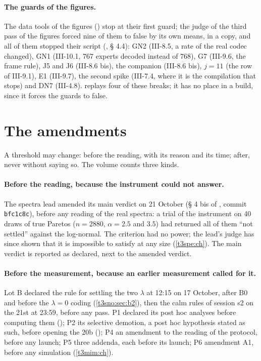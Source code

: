 \paragraph{The guards of the figures.} The data tools of the figures () stop at their first guard; the judge of the third pass of the figures forced nine of them to false by its own means, in a copy, and all of them stopped their script (, § 4.4): GN2 (III-8.5, a rate of the real codec changed), GN1 (III-10.1, 767 experts decoded instead of 768), G7 (III-9.6, the frame rule), J5 and J6 (III-8.6 bis), the companion (III-8.6 bis), $j = 11$ (the row of III-9.1), E1 (III-9.7), the second spike (III-7.4, where it is the compilation that stops) and DN7 (III-4.8).  replays four of these breaks; it has no place in a build, since it forces the guards to false.

\section{The amendments}\label{t3ann:sec:amendements}

A threshold may change: before the reading, with its reason and its time; after, never without saying so. The volume counts three kinds.

\paragraph{Before the reading, because the instrument could not answer.} The spectra lead amended its main verdict on 21 October (§ 4 bis of , commit \texttt{bfc1c8c}), before any reading of the real spectra: a trial of the instrument on 40 draws of true Paretos ($n = \num{2880}$, $\alpha = 2.5$ and $3.5$) had returned all of them ``not settled'' against the log-normal. The criterion had no power; the lead's judge has since shown that it is impossible to satisfy at any size (\cref{t3spe:ch}). The main verdict is reported as declared, next to the amended verdict.

\paragraph{Before the measurement, because an earlier measurement called for it.} Lot B declared the rule for settling the two $\lambda$ at 12:15 on 17 October, after B0 and before the $\lambda = 0$ coding (\cref{t3sno:sec:b2}), then the calm rules of session s2 on the 21st at 23:59, before any pass. P1 declared its post hoc analyses before computing them (); P2 its selective demotion, a post hoc hypothesis stated as such, before opening the 20b (); P4 an amendment to the reading of the protocol, before any launch; P5 three addenda, each before its launch; P6 amendment A1, before any simulation (\cref{t3mim:ch}).

